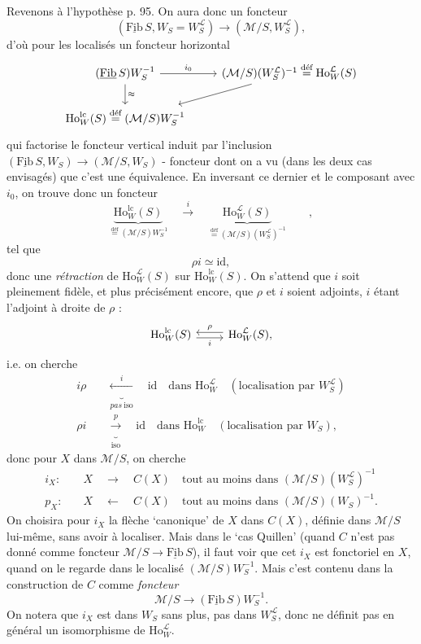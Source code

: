 \documentclass[11pt]{article}
\newcommand{\printedpage}[1]{\marginpar{\footnotesize p.~#1}}
\newcommand{\msp}[1]{\marginpar{\footnotesize [#1]}}
\newcommand{\Fibu}{\underline{\mathrm{Fib}}\,}
\newcommand{\Ho}{\mathrm{Ho}}
\newcommand{\WL}{W_S^{\mathcal{L}}}
\newcommand{\defeq}{\overset{\text{déf}}{=}}
\begin{document}
Revenons à l'hypothèse p. 95. On aura donc un foncteur
\[
(\Fibu S, W_S = \WL) \longrightarrow (\mathcal{M}/S, \WL),
\]
d'où pour les localisés un foncteur horizontal
\[
\begin{tikzcd}
(\Fibu S)W_S^{-1} \arrow[r, "i_0"] \arrow[d, "\approx"] & (\mathcal{M}/S)(\WL)^{-1} \defeq \Ho_W^{\mathcal{L}}(S) \arrow[dl] \\
\Ho_W^{\mathrm{lc}}(S) \defeq (\mathcal{M}/S)W_S^{-1} &
\end{tikzcd}
\]
qui factorise le foncteur vertical induit par l'inclusion $(\Fibu S, W_S) \longrightarrow (\mathcal{M}/S, W_S)$ - foncteur dont on a vu (dans les deux cas envisagés) que c'est une équivalence. En inversant ce dernier et le composant avec $i_0$, on trouve donc un foncteur
\[
\underbrace{\Ho_W^{\mathrm{lc}}(S)}_{\defeq (\mathcal{M}/S)W_S^{-1}} \quad \xrightarrow{\ i\ } \quad \underbrace{\Ho_W^{\mathcal{L}}(S)}_{\defeq (\mathcal{M}/S)(\WL)^{-1}} \qquad ,
\]
tel que
\[
\rho i \simeq \mathrm{id},
\]
donc une \textit{rétraction} de $\Ho_W^{\mathcal{L}}(S)$ sur $\Ho_W^{\mathrm{lc}}(S)$. On s'attend que $i$ soit pleinement fidèle, et plus précisément encore, \msp{page 98} que $\rho$ et $i$ soient adjoints, $i$ étant l'adjoint à droite de $\rho$ :
\[
\begin{tikzcd}
\Ho_W^{\mathrm{lc}}(S) \arrow[r, shift right, "i"'] & \Ho_W^{\mathcal{L}}(S), \arrow[l, shift right, "\rho"']
\end{tikzcd}
\]
\printedpage{62}
i.e. on cherche
\[
\begin{aligned}
i\rho &\quad \underbrace{\xleftarrow{\ i\ }}_{\textit{pas}\ \text{iso}} \quad \mathrm{id} \quad \text{dans } \Ho_W^{\mathcal{L}} \quad (\text{localisation par } \WL)\\
\rho i &\quad \underbrace{\xrightarrow{\ p\ }}_{\text{iso}} \quad \mathrm{id} \quad \text{dans } \Ho_W^{\mathrm{lc}} \quad (\text{localisation par } W_S),
\end{aligned}
\]
 donc pour $X$ dans $\mathcal{M}/S$, on cherche
\[
\begin{aligned}
i_X :&\quad X \quad \longrightarrow \quad C(X) \quad \text{tout au moins dans } (\mathcal{M}/S)(\WL)^{-1}\\
p_X :&\quad X \quad \longleftarrow \quad C(X) \quad \text{tout au moins dans } (\mathcal{M}/S)(W_S)^{-1}.
\end{aligned}
\]
On choisira pour $i_X$ la flèche `canonique' de $X$ dans $C(X)$, définie dans $\mathcal{M}/S$ lui-même, sans avoir à localiser. Mais dans le `cas Quillen' (quand $C$ n'est pas donné comme foncteur $\mathcal{M}/S \longrightarrow \Fibu S$), il faut voir que cet $i_X$ est fonctoriel en $X$, quand on le regarde dans le localisé $(\mathcal{M}/S)W_S^{-1}$. Mais c'est contenu dans la construction de $C$ comme \textit{foncteur}
\[
\mathcal{M}/S \longrightarrow (\Fibu S)W_S^{-1}.
\]
On notera que $i_X$ est dans $W_S$ sans plus, pas dans $\WL$, donc ne définit pas en général un isomorphisme de $\Ho_W^{\mathcal{L}}$.
\end{document}
